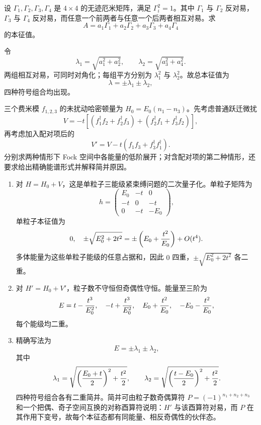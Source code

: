 \begin{question}
设 $\Gamma_1,\Gamma_2,\Gamma_3,\Gamma_4$ 是 $4\times4$ 的无迹厄米矩阵，满足 $\Gamma_i^2=1$。其中 $\Gamma_1$ 与 $\Gamma_2$ 反对易，$\Gamma_3$ 与 $\Gamma_4$ 反对易，而任意一个前两者与任意一个后两者相互对易。求
\[
  A=a_1\Gamma_1+a_2\Gamma_2+a_3\Gamma_3+a_4\Gamma_4
\]
的本征值。
\begin{solution}
令
\[
  \lambda_1=\sqrt{a_1^2+a_2^2},
  \qquad \lambda_2=\sqrt{a_3^2+a_4^2}.
\]
两组相互对易，可同时对角化；每组平方分别为 $\lambda_1^2$ 与 $\lambda_2^2$。故总本征值为
\[
  \lambda=\pm\lambda_1\pm\lambda_2,
\]
四种符号组合均出现。
\end{solution}
\end{question}

\begin{question}
三个费米模 $f_{1,2,3}$ 的未扰动哈密顿量为 $H_0=E_0(n_1-n_3)$。先考虑普通跃迁微扰
\[
  V=-t[(f_1^\dagger f_2+f_2^\dagger f_3)+(f_2^\dagger f_1+f_3^\dagger f_2)],
\]
再考虑加入配对项后的
\[
  V'=V-t(f_1f_3+f_3^\dagger f_1^\dagger).
\]
分别求两种情形下 Fock 空间中各能量的低阶展开；对含配对项的第二种情形，还要求给出精确能谱形式并解释简并原因。
\begin{solution}
\begin{enumerate}
  \item 对 $H=H_0+V$，这是单粒子三能级紧束缚问题的二次量子化。单粒子矩阵为
  \[
    h=\begin{pmatrix}E_0&-t&0\\-t&0&-t\\0&-t&-E_0\end{pmatrix},
  \]
  单粒子本征值为
  \[
    0,\quad \pm\sqrt{E_0^2+2t^2}=\pm\left(E_0+{t^2\over E_0}\right)+O(t^4).
  \]
  多体能量为这些单粒子能级的任意占据和，因此 $0$ 四重，$\pm\sqrt{E_0^2+2t^2}$ 各二重。
  \item 对 $H'=H_0+V'$，粒子数不守恒但奇偶性守恒。能量至三阶为
  \[
    E= t-{t^3\over E_0^2},\quad -t+{t^3\over E_0^2},
    \quad E_0+{t^2\over E_0},
    \quad -E_0-{t^2\over E_0},
  \]
  每个能级均二重。
  \item 精确写法为
  \[
    E=\pm\lambda_1\pm\lambda_2,
  \]
  其中
  \[
    \lambda_1=\sqrt{\left({E_0+t\over2}\right)^2+{t^2\over2}},
    \qquad
    \lambda_2=\sqrt{\left({t-E_0\over2}\right)^2+{t^2\over2}}.
  \]
  四种符号组合各有二重简并。简并可由粒子数奇偶算符 $P=(-1)^{n_1+n_2+n_3}$ 和一个把偶、奇子空间互换的对称酉算符说明：$H'$ 与该酉算符对易，而 $P$ 在其作用下变号，故每个本征态都有同能量、相反奇偶性的伙伴态。
\end{enumerate}
\end{solution}
\end{question}
